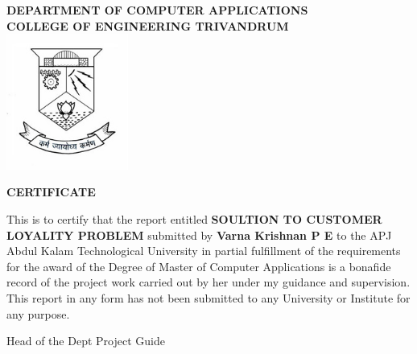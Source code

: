 \begin{titlepage}
\begin{center}

\textbf{DEPARTMENT OF COMPUTER APPLICATIONS}\\[0.5cm]
\textbf{ COLLEGE OF ENGINEERING TRIVANDRUM}\\
[0.5cm]

\vspace{1.2cm}
\includegraphics[width=0.30\textwidth]{2.jpg}\\
\vspace{0.8cm}

\large\textbf{CERTIFICATE}\\
\end{center}

This is to certify that the report entitled 
\textbf{SOULTION TO CUSTOMER LOYALITY PROBLEM} submitted by
\textbf{Varna Krishnan P E} to the APJ Abdul Kalam Technological University in partial
fulfillment of the requirements for the award of the Degree of Master of
Computer Applications is a bonafide record of the project work carried out by
her under my guidance and supervision. This report in any form has not been
submitted to any University or Institute for any purpose.

\vspace{4 cm}

\noindent Head of the Dept
\hfill Project Guide
\\ \\\\


\end{titlepage}
